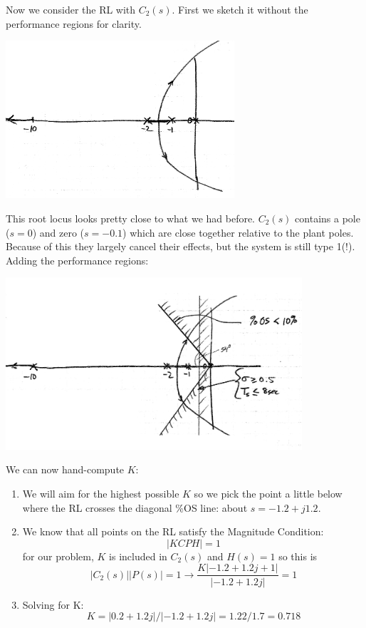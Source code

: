 \begin{ExampleCont}
Now we consider the RL with $C_2(s)$.   First we sketch it without 
the performance regions for clarity.   

\includegraphics[width=85mm]{figs09/01109.png}

This root locus looks pretty close to what we had before.  
 $C_2(s)$ contains a pole ($s=0$) and zero ($s=-0.1$) which are close together relative to the plant poles.  Because
 of this they largely cancel their effects, but the system is still type 1(!).  Adding the performance regions: 
 
 \includegraphics[width=110mm]{figs09/01110.png}

 We can now hand-compute $K$:
 
 \begin{enumerate}
   \item We will aim for the highest possible $K$ so we pick the point a little below where the RL crosses the diagonal \%OS line:
   about $s = -1.2+j1.2$.
   \item We know that all points on the RL satisfy the Magnitude Condition:
   \[
   |KCPH| = 1
   \]
   for our problem, $K$ is included in $C_2(s)$ and $H(s) =1$  so this is
   \[
   |C_2(s)||P(s)| = 1 \to  \frac   {K|-1.2+1.2j+1|} {|-1.2+1.2j|} = 1
   \]
   \item Solving for K:
   \[
   K = |0.2+1.2j|/|-1.2+1.2j| = 1.22/1.7 = 0.718
   \]
   
 \end{enumerate}
\end{ExampleCont}


